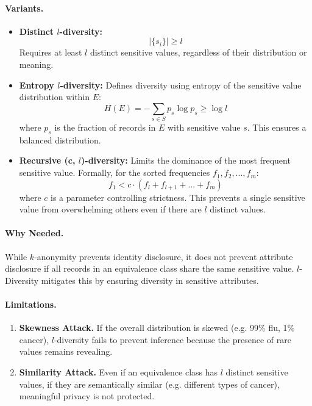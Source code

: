 \documentclass{article}
\begin{document}
\paragraph{Variants.}
\begin{itemize}
    \item \textbf{Distinct $l$-diversity:}
    \[
    |\{ s_i \}| \geq l
    \]
    Requires at least $l$ distinct sensitive values, regardless of their distribution or meaning.

    \item \textbf{Entropy $l$-diversity:}
    Defines diversity using entropy of the sensitive value distribution within $E$:
    \[
    H(E) = - \sum_{s \in S} p_s \log p_s \geq \log l
    \]
    where $p_s$ is the fraction of records in $E$ with sensitive value $s$. This ensures a balanced distribution.

    \item \textbf{Recursive (c, $l$)-diversity:}
    Limits the dominance of the most frequent sensitive value. Formally, for the sorted frequencies $f_1, f_2, ..., f_m$:
    \[
    f_1 < c \cdot (f_l + f_{l+1} + ... + f_m)
    \]
    where $c$ is a parameter controlling strictness. This prevents a single sensitive value from overwhelming others even if there are $l$ distinct values.
\end{itemize}

\paragraph{Why Needed.}
While $k$-anonymity prevents identity disclosure, it does not prevent attribute disclosure if all records in an equivalence class share the same sensitive value. $l$-Diversity mitigates this by ensuring diversity in sensitive attributes.

\paragraph{Limitations.}
\begin{enumerate}
    \item \textbf{Skewness Attack.} If the overall distribution is skewed (e.g. 99\% flu, 1\% cancer), $l$-diversity fails to prevent inference because the presence of rare values remains revealing.

    \item \textbf{Similarity Attack.} Even if an equivalence class has $l$ distinct sensitive values, if they are semantically similar (e.g. different types of cancer), meaningful privacy is not protected.
\end{enumerate}
\end{document}
